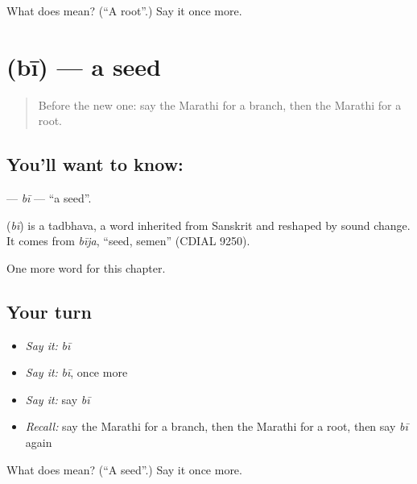 \begin{tcolorbox}[breakable,colback=teal!4,colframe=teal!35!black,title={Before you move on}]
What does  mean? (\textquotedblleft{}A root\textquotedblright{}.) Say it once more.
\end{tcolorbox}
\section[\texorpdfstring{\mr{बी} (bī)}{बी (bī)}]{ (bī) — a seed}

\label{lesson:MR-C140-bi}



\begin{quote}
Before the new one: say the Marathi for a branch, then the Marathi for a root.
\end{quote}

\subsection*{You'll want to know: }
\textbf{} — \emph{bī} — \textquotedblleft{}a seed\textquotedblright{}.

\begin{cousinweb}
\textbf{} (\emph{bī}) is a tadbhava, a word inherited from Sanskrit and reshaped by sound change. It comes from \emph{bīja}, \textquotedblleft{}seed, semen\textquotedblright{} (CDIAL 9250).
\end{cousinweb}

\begin{grammarlens}[title={What you've built}]
One more word for this chapter.
\end{grammarlens}

\subsection*{Your turn}
\begin{itemize}
\raggedright
  \item \emph{Say it:} \emph{bī}
  \item \emph{Say it:} \emph{bī}, once more
  \item \emph{Say it:} say \emph{bī}
  \item \emph{Recall:} say the Marathi for a branch, then the Marathi for a root, then say \emph{bī} again
\end{itemize}

\begin{tcolorbox}[breakable,colback=teal!4,colframe=teal!35!black,title={Before you move on}]
What does  mean? (\textquotedblleft{}A seed\textquotedblright{}.) Say it once more.
\end{tcolorbox}
